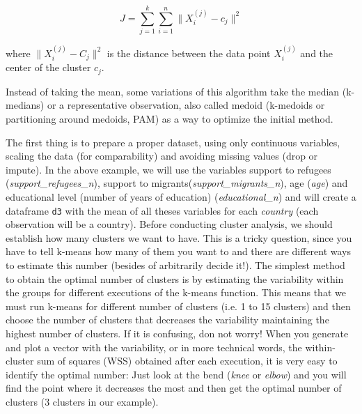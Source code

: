 $$J = \sum_{j=1}^{k} \sum_{i=1}^{n} \big\| X_i^{(j)} - c_j \big\| ^2$$

where $ \big\| X_i^{(j)} - C_j \big\| ^2$ is the distance between the data point $X_i^{(j)}$ and the center of the cluster $c_j$.

Instead of taking the mean, some variations of this algorithm take the median (k-medians) or a representative observation, also called medoid (k-medoids or partitioning around medoids, PAM) as a way to optimize the initial method.

The first thing is to prepare a proper dataset, using only continuous variables, scaling the data (for comparability) and avoiding missing values (drop or impute). In the above example, we will use the variables support to refugees (\emph{support\_refugees\_n}), support to migrants(\emph{support\_migrants\_n}), age (\emph{age}) and educational level (number of years of education) (\emph{educational\_n}) and will create a dataframe \verb+d3+ with the mean of all theses variables for each \emph{country} (each observation will be a country). Before conducting cluster analysis, we should establish how many clusters we want to have. This is a tricky question, since you have to tell k-means how many of them you want to and there are different ways to estimate this number (besides of arbitrarily decide it!). The simplest method to obtain the optimal number of clusters is by estimating the variability within the groups for different executions of the k-means function. This means that we must run k-means for different number of clusters (i.e. 1 to 15 clusters) and then choose the number of clusters that decreases the variability maintaining the highest number of clusters. If it is confusing, don not worry!  When you generate and plot a vector with the variability, or in more technical words, the within-cluster sum of squares (WSS) obtained after each execution, it is very easy to identify the optimal number: Just look at the bend (\textit{knee} or \textit{elbow}) and you will find the point where it decreases the most and then get the optimal number of clusters (3 clusters in our example).


